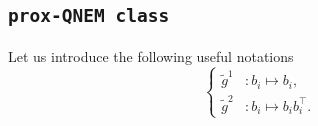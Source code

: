 \documentclass[11pt]{article}
\begin{document}
\subsection{\texttt{prox-QNEM class}}
\label{sec:prox-QNEM class}

Let us introduce the following useful notations
\begin{equation*}
  \left\{
    \begin{array}{ll}
    \tilde g^1&: b_i \mapsto b_i,\\
    \tilde g^2&: b_i \mapsto b_ib_i^\top.
    \end{array}
  \right. 
\end{equation*}



{}
\end{document}

